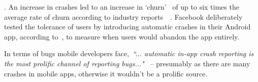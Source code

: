 


\medskip


. An increase in crashes led to an increase in `churn'~ of up to six times the average rate of churn according to industry reports~~. 
Facebook deliberately tested the tolerance of users by introducing automatic crashes in their Android app, according to~, to measure when users would abandon the app entirely. %

In terms of bugs mobile developers face,~\emph{``... automatic in-app crash reporting is the most prolific channel of reporting bugs..."}~ %
-- presumably as there are many crashes in mobile apps, otherwise it wouldn't be a prolific source. 

